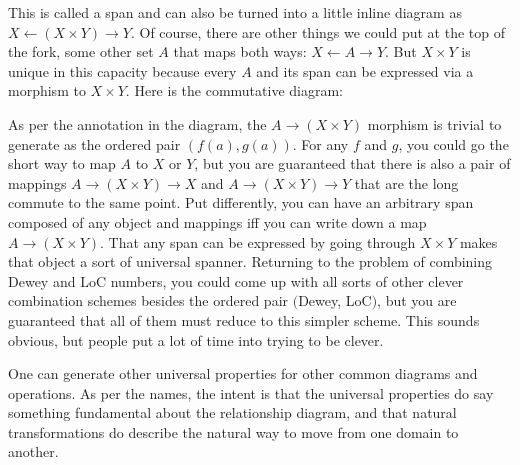 \documentclass[11pt]{article}
\begin{document}

This is called a span and can also be turned into a little inline diagram as
$X \leftarrow (X\times Y) \rightarrow Y$.
Of course, there are other things we could put at the top of the fork, some other
set $A$ that maps both ways: $X \leftarrow A \rightarrow Y$.
But $X\times Y$ is unique in this capacity because every $A$ and its span can be expressed
via a morphism to $X\times Y$. Here is the commutative diagram:


As per the annotation in the diagram, the $A\to (X\times Y)$ morphism is trivial to generate as
the ordered pair $(f(a), g(a))$.  For any $f$ and $g$, you could go the short way to
map $A$ to $X$ or $Y$, but you are guaranteed that there is also a pair of mappings
$A\to (X\times Y) \to X$ and $A\to (X\times Y) \to Y$ that are the long commute to the
same point.  Put differently, you can have an arbitrary span composed of any object and
mappings iff you can write down a map $A\to (X\times Y)$. That any span can be expressed
by going through $X\times Y$ makes that object a sort of universal spanner. Returning
to the problem of combining Dewey and LoC numbers, you could come up with all sorts
of other clever combination schemes besides the ordered pair $($Dewey, LoC$)$, but
you are guaranteed that all of them must reduce to this simpler scheme. This sounds
obvious, but people put a lot of time into trying to be clever.

One can generate other universal properties for other common diagrams and operations.
As per the names, the intent is that the universal properties do say something fundamental
about the relationship diagram, and that natural transformations do describe the
natural way to move from one domain to another.

\nocite{awodey:category}
\nocite{riehl:category}
\nocite{lawvere:conceptual}
\nocite{leinster:basic}


\end{document}
